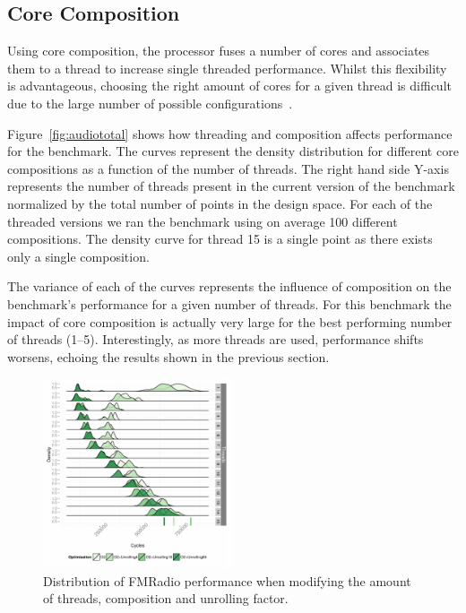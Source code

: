 \subsection{Core Composition}

Using core composition, the processor fuses a number of cores and associates them to a thread to increase single threaded performance.
Whilst this flexibility is advantageous, choosing the right amount of cores for a given thread is difficult due to the large number of possible configurations~\cite{gulati2008multitaskingdmc}.
\vspace{1mm}

Figure~\ref{fig:audiototal} shows how threading and composition affects performance for the  benchmark.
The curves represent the density distribution for different core compositions as a function of the number of threads.
The right hand side Y-axis represents the number of threads present in the current version of the benchmark normalized by the total number of points in the design space.
For each of the threaded versions we ran the benchmark using on average 100 different compositions.
The density curve for thread 15 is a single point as there exists only a single composition.
\vspace{1mm}

The variance of each of the curves represents the influence of composition on the benchmark's performance for a given number of threads.
For this benchmark the impact of core composition is actually very large for the best performing number of threads (1--5).
Interestingly, as more threads are used,  performance shifts worsens, echoing the results shown in the previous section.

\begin{figure}[t]
  \includegraphics[width=0.5\textwidth]{graphics/unrolled_fm.pdf}
  \caption{Distribution of FMRadio performance when modifying the amount of threads, composition and unrolling factor.}\label{fig:fmunroll}
\end{figure}

